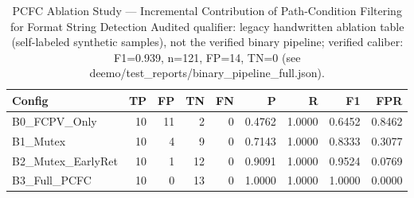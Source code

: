 \begin{table}[htbp]
\centering
\caption{PCFC Ablation Study --- Incremental Contribution of Path-Condition Filtering for Format String Detection Audited qualifier: legacy handwritten ablation table (self-labeled synthetic samples), not the verified binary pipeline; verified caliber: F1=0.939, n=121, FP=14, TN=0 (see deemo/test_reports/binary_pipeline_full.json).}
\label{tab:pcfc_ablation}
\begin{tabular}{lrrrrrrrr}
\toprule
Config & TP & FP & TN & FN & P & R & F1 & FPR \\
\midrule
  B0_FCPV_Only & 10 & 11 & 2 & 0 & 0.4762 & 1.0000 & 0.6452 & 0.8462 \\ %
  B1_Mutex & 10 & 4 & 9 & 0 & 0.7143 & 1.0000 & 0.8333 & 0.3077 \\ %
  B2_Mutex_EarlyRet & 10 & 1 & 12 & 0 & 0.9091 & 1.0000 & 0.9524 & 0.0769 \\ %
  B3_Full_PCFC & 10 & 0 & 13 & 0 & 1.0000 & 1.0000 & 1.0000 & 0.0000 \\ %
\bottomrule
\end{tabular}
\end{table}
